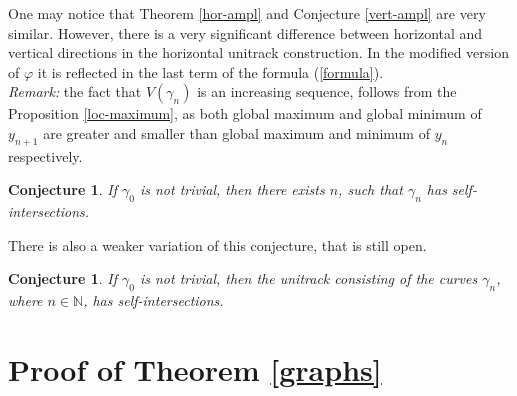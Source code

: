 \documentclass{article}
\newtheorem{conjecture}[theorem]{Conjecture}
\theoremstyle{definition}
\newcommand{\N}{{\mathbb N}}
\newcommand{\vphi}{\varphi}
\begin{document}
    One may notice that Theorem \ref{hor-ampl} and Conjecture \ref{vert-ampl} are very similar. However, there is a very significant difference between horizontal and vertical directions in the horizontal unitrack construction. In the modified version of $\vphi$ it is reflected in the last term of the formula (\ref{formula}).\\
    
    \textit{Remark:} the fact that $V(\gamma_n)$ is an increasing sequence, follows from the Proposition \ref{loc-maximum}, as both global maximum and global minimum of $y_{n+1}$ are greater and smaller than global maximum and minimum of $y_n$ respectively.\\

    \begin{conjecture}
        If $\gamma_0$ is not trivial, then there exists $n$, such that $\gamma_n$ has self-intersections. 
    \end{conjecture}

    There is also a weaker variation of this conjecture, that is still open.

    \begin{conjecture}
        If $\gamma_0$ is not trivial, then the unitrack consisting of the curves $\gamma_n$, where $n\in\N$, has self-intersections. 
    \end{conjecture}

\section{Proof of Theorem \ref{graphs}}
\label{proof1}
\end{document}
